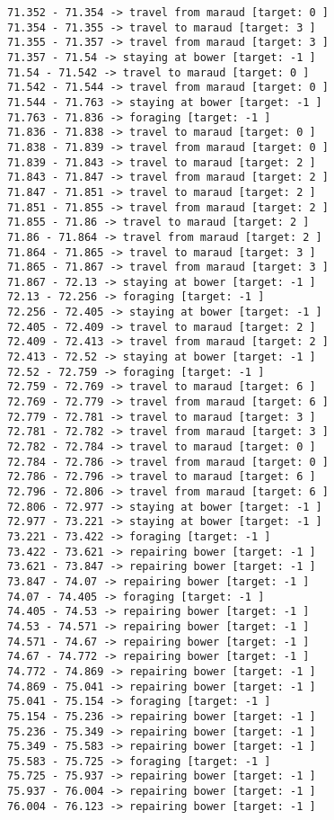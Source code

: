 \documentclass[11pt]{article}
\begin{document}
\begin{Verbatim}[commandchars=\\\{\}]
71.352 - 71.354 -> travel from maraud [target: 0 ]
71.354 - 71.355 -> travel to maraud [target: 3 ]
71.355 - 71.357 -> travel from maraud [target: 3 ]
71.357 - 71.54 -> staying at bower [target: -1 ]
71.54 - 71.542 -> travel to maraud [target: 0 ]
71.542 - 71.544 -> travel from maraud [target: 0 ]
71.544 - 71.763 -> staying at bower [target: -1 ]
71.763 - 71.836 -> foraging [target: -1 ]
71.836 - 71.838 -> travel to maraud [target: 0 ]
71.838 - 71.839 -> travel from maraud [target: 0 ]
71.839 - 71.843 -> travel to maraud [target: 2 ]
71.843 - 71.847 -> travel from maraud [target: 2 ]
71.847 - 71.851 -> travel to maraud [target: 2 ]
71.851 - 71.855 -> travel from maraud [target: 2 ]
71.855 - 71.86 -> travel to maraud [target: 2 ]
71.86 - 71.864 -> travel from maraud [target: 2 ]
71.864 - 71.865 -> travel to maraud [target: 3 ]
71.865 - 71.867 -> travel from maraud [target: 3 ]
71.867 - 72.13 -> staying at bower [target: -1 ]
72.13 - 72.256 -> foraging [target: -1 ]
72.256 - 72.405 -> staying at bower [target: -1 ]
72.405 - 72.409 -> travel to maraud [target: 2 ]
72.409 - 72.413 -> travel from maraud [target: 2 ]
72.413 - 72.52 -> staying at bower [target: -1 ]
72.52 - 72.759 -> foraging [target: -1 ]
72.759 - 72.769 -> travel to maraud [target: 6 ]
72.769 - 72.779 -> travel from maraud [target: 6 ]
72.779 - 72.781 -> travel to maraud [target: 3 ]
72.781 - 72.782 -> travel from maraud [target: 3 ]
72.782 - 72.784 -> travel to maraud [target: 0 ]
72.784 - 72.786 -> travel from maraud [target: 0 ]
72.786 - 72.796 -> travel to maraud [target: 6 ]
72.796 - 72.806 -> travel from maraud [target: 6 ]
72.806 - 72.977 -> staying at bower [target: -1 ]
72.977 - 73.221 -> staying at bower [target: -1 ]
73.221 - 73.422 -> foraging [target: -1 ]
73.422 - 73.621 -> repairing bower [target: -1 ]
73.621 - 73.847 -> repairing bower [target: -1 ]
73.847 - 74.07 -> repairing bower [target: -1 ]
74.07 - 74.405 -> foraging [target: -1 ]
74.405 - 74.53 -> repairing bower [target: -1 ]
74.53 - 74.571 -> repairing bower [target: -1 ]
74.571 - 74.67 -> repairing bower [target: -1 ]
74.67 - 74.772 -> repairing bower [target: -1 ]
74.772 - 74.869 -> repairing bower [target: -1 ]
74.869 - 75.041 -> repairing bower [target: -1 ]
75.041 - 75.154 -> foraging [target: -1 ]
75.154 - 75.236 -> repairing bower [target: -1 ]
75.236 - 75.349 -> repairing bower [target: -1 ]
75.349 - 75.583 -> repairing bower [target: -1 ]
75.583 - 75.725 -> foraging [target: -1 ]
75.725 - 75.937 -> repairing bower [target: -1 ]
75.937 - 76.004 -> repairing bower [target: -1 ]
76.004 - 76.123 -> repairing bower [target: -1 ]

\end{Verbatim}
\end{document}
